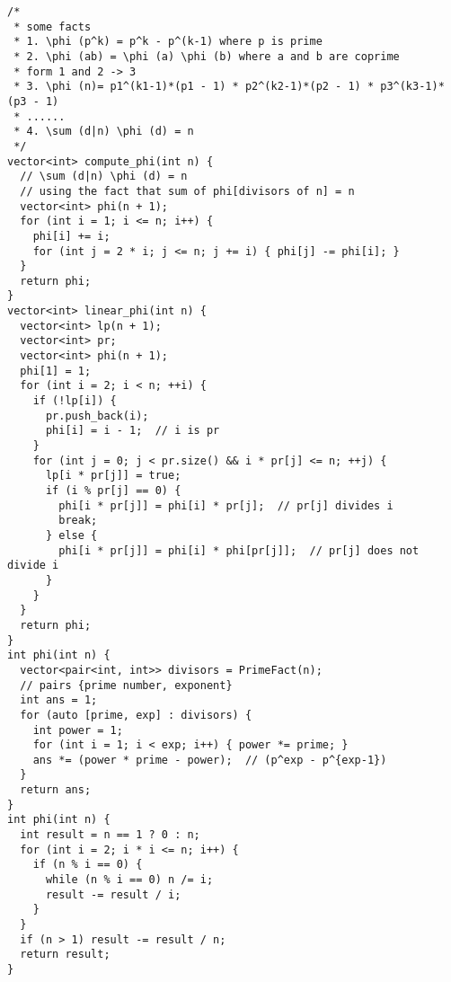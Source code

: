\documentclass[twoside]{article}
\begin{document}
\begin{multicols*}{2}
\begin{verbatim}
/*
 * some facts
 * 1. \phi (p^k) = p^k - p^(k-1) where p is prime
 * 2. \phi (ab) = \phi (a) \phi (b) where a and b are coprime
 * form 1 and 2 -> 3
 * 3. \phi (n)= p1^(k1-1)*(p1 - 1) * p2^(k2-1)*(p2 - 1) * p3^(k3-1)*(p3 - 1)
 * ......
 * 4. \sum (d|n) \phi (d) = n
 */
vector<int> compute_phi(int n) {
  // \sum (d|n) \phi (d) = n
  // using the fact that sum of phi[divisors of n] = n
  vector<int> phi(n + 1);
  for (int i = 1; i <= n; i++) {
    phi[i] += i;
    for (int j = 2 * i; j <= n; j += i) { phi[j] -= phi[i]; }
  }
  return phi;
}
vector<int> linear_phi(int n) {
  vector<int> lp(n + 1);
  vector<int> pr;
  vector<int> phi(n + 1);
  phi[1] = 1;
  for (int i = 2; i < n; ++i) {
    if (!lp[i]) {
      pr.push_back(i);
      phi[i] = i - 1;  // i is pr
    }
    for (int j = 0; j < pr.size() && i * pr[j] <= n; ++j) {
      lp[i * pr[j]] = true;
      if (i % pr[j] == 0) {
        phi[i * pr[j]] = phi[i] * pr[j];  // pr[j] divides i
        break;
      } else {
        phi[i * pr[j]] = phi[i] * phi[pr[j]];  // pr[j] does not divide i
      }
    }
  }
  return phi;
}
int phi(int n) {
  vector<pair<int, int>> divisors = PrimeFact(n);
  // pairs {prime number, exponent}
  int ans = 1;
  for (auto [prime, exp] : divisors) {
    int power = 1;
    for (int i = 1; i < exp; i++) { power *= prime; }
    ans *= (power * prime - power);  // (p^exp - p^{exp-1})
  }
  return ans;
}
int phi(int n) {
  int result = n == 1 ? 0 : n;
  for (int i = 2; i * i <= n; i++) {
    if (n % i == 0) {
      while (n % i == 0) n /= i;
      result -= result / i;
    }
  }
  if (n > 1) result -= result / n;
  return result;
}
\end{verbatim}

{
}
\end{multicols*}
\end{document}

